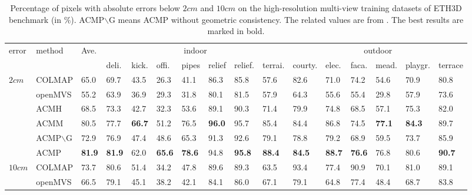 \documentclass[letterpaper]{article} %
\begin{document}
\begin{table}[t]
	\caption{Percentage of pixels with absolute errors below $2cm$ and $10cm$ on the high-resolution multi-view training datasets of ETH3D benchmark (in $\%$). ACMP$\backslash$G means ACMP without geometric consistency. The related values are from \cite{Xu2018Multi}. The best results are marked in bold.}
	\centering
	\footnotesize
	\begin{tabular}{p{0.6cm}<{\centering}p{1.36cm}<{\centering}p{0.5cm}<{\centering}p{0.5cm}<{\centering}p{0.5cm}<{\centering}p{0.5cm}<{\centering}p{0.45cm}<{\centering}p{0.5cm}<{\centering}p{0.5cm}<{\centering}p{0.5cm}<{\centering}p{0.7cm}<{\centering}p{0.5cm}<{\centering}p{0.5cm}<{\centering}p{0.6cm}<{\centering}p{0.7cm}<{\centering}p{0.7cm}<{\centering}}
		\toprule %
		\multirow{2}{*}{error} & \multirow{2}{*}{method} & \multirow{2}{*}{Ave.} & \multicolumn{7}{c}{indoor} & \multicolumn{6}{c}{outdoor} \\
		\cmidrule(lr){4-10} \cmidrule(lr){11-16} %
		& & & deli. & kick. & offi. & pipes & relief & relief. & terrai. & courty. & elec. & faca. & mead. & playgr. & terrace \\
		\midrule %
		\multirow{6}{*}{$2 cm$} & {COLMAP} & 65.0 & 69.7 & {43.5} & 26.3 & 41.1 & 86.3 & 85.8 & 57.6 & {82.6} & 71.0 & {74.2} & 54.6 & 70.9 & 80.8 \\
		& {openMVS} & 55.2 & 63.9 & 36.9 & 29.3 & 31.8 & 80.1 & 81.5 & 57.9 & 64.3 & 55.6 & 55.4 & 29.8 & 57.9 & 73.6 \\
		& {ACMH} & 68.5 & {73.3} & 42.7 & {32.3} & {53.6} & {89.1} & {90.3} & {71.4} & 79.9 & {74.8} & 68.5 & {57.1} & {75.3} & {82.0} \\
		& {ACMM} & 80.5 & {77.7} & {\bf 66.7} & {51.2} & {76.5} & {\bf 96.0} & {95.7} & {85.4} & {84.4} & {86.8} & {74.5} & {\bf 77.1} & {\bf 84.3} & {89.7} \\
		& {ACMP$\backslash$G} & 72.9 & 76.9 & 47.4 & 48.6 & 65.3 & 91.3 & 92.6 & 79.1 & 78.8 & 79.2 & 68.9 & 59.5 & 73.7 & 85.9 \\
		& {ACMP} & {\bf 81.9} & {\bf 81.9} & 62.0 & {\bf 65.6} & {\bf 78.6} & 94.8 & {\bf 95.8} & {\bf 88.4} & {\bf 84.5} & {\bf 88.7} & {\bf 76.6} & 76.8 & 80.6 & {\bf 90.7} \\
		\midrule %
		\multirow{6}{*}{$10 cm$} & {COLMAP} & 73.7 & 80.6 & 51.4 & 34.2 & 47.8 & 89.6 & 89.3 & 63.5 & 93.4 & 77.4 & {90.9} & 70.1 & 81.0 & 89.1 \\
		& {openMVS} & 66.5 & 79.1 & 45.1 & 38.2 & 42.1 & 84.1 & 86.0 & 67.1 & 79.1 & 64.8 & 77.4 & 48.4 & 68.7 & 83.8 \\

\end{tabular}
\end{table}
\end{document}
